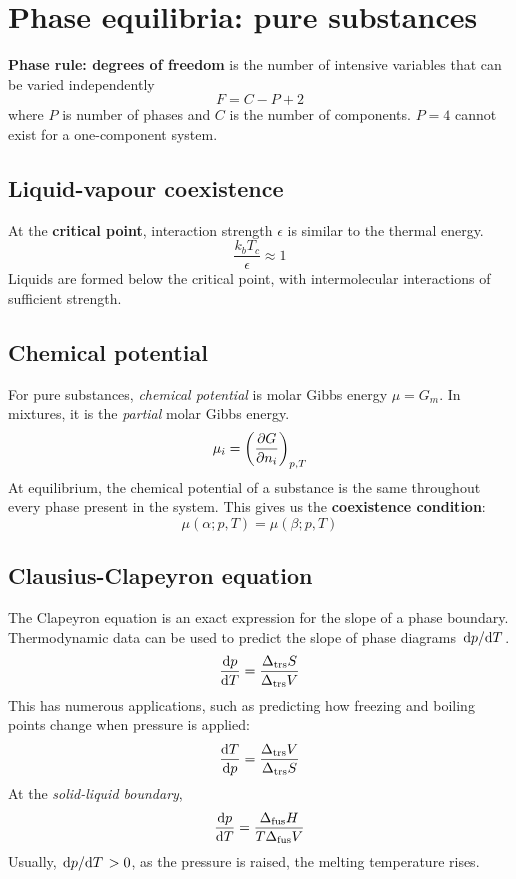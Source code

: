 \section{Phase equilibria: pure substances}

\textbf{Phase rule: degrees of freedom} is the number of intensive variables that can be varied independently
\begin{equation*}
    F = C - P + 2
\end{equation*}
where $P$ is number of phases and $C$ is the number of components. $P = 4$ cannot exist for a one-component system.

\subsection*{Liquid-vapour coexistence}
At the \textbf{critical point}, interaction strength $\epsilon$ is similar to the thermal energy.
\begin{equation*}
    \frac{k_bT_c}{\epsilon} \approx 1
\end{equation*}
Liquids are formed below the critical point, with intermolecular interactions of sufficient strength.

\subsection*{Chemical potential}
For pure substances, \textit{chemical potential} is molar Gibbs energy $\mu = G_m$. In mixtures, it is the \textit{partial}
molar Gibbs energy.
\begin{equation*}
    \mu_i = \left(\pdv{G}{n_i}\right)_{p,T}
\end{equation*}
At equilibrium, the chemical potential of a substance is the same throughout every phase present in the system. This
gives us the \textbf{coexistence condition}:
\begin{equation*}
    \mu(\alpha;p,T) = \mu(\beta;p,T)
\end{equation*}

\subsection*{Clausius-Clapeyron equation}
The Clapeyron equation is an exact expression for the slope of a phase boundary.
Thermodynamic data can be used to predict the slope of phase diagrams $\dv*{p}{T}$.
\begin{equation*}
    \dv{p}{T} = \frac{\Delta_{\textrm{trs}}S}{\Delta_{\textrm{trs}}V}
\end{equation*}
This has numerous applications, such as predicting how freezing and boiling points change when pressure is applied:
\begin{equation*}
    \dv{T}{p} = \frac{\Delta_{\textrm{trs}}V}{\Delta_{\textrm{trs}}S}
\end{equation*}
At the \textit{solid-liquid boundary},
\begin{equation*}
    \dv{p}{T} = \frac{\Delta_{\textrm{fus}}H}{T\Delta_{\textrm{fus}}V}
\end{equation*}
Usually, $\dv*{p}{T} > 0$, as the pressure is raised, the melting temperature rises.

